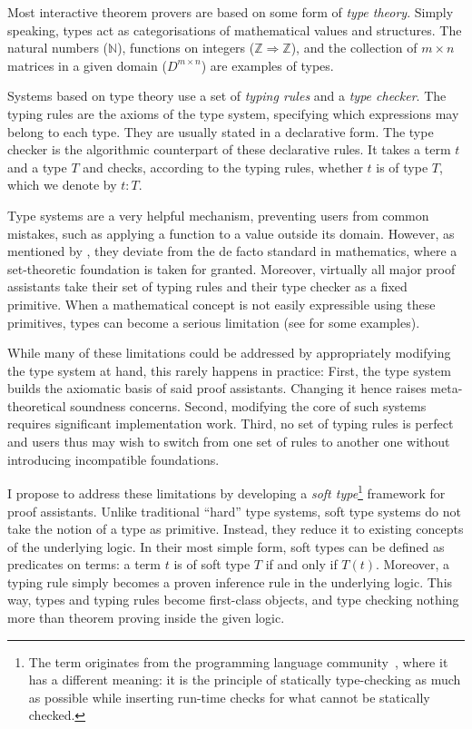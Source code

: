 \documentclass[a4paper, 12pt]{article}
\theoremstyle{plain}
\theoremstyle{definition}
\begin{document}
Most interactive theorem provers
are based on some form of \emph{type theory}.
Simply speaking,
types act as categorisations of mathematical values and structures.
The natural numbers ($\mathbb{N}$),
functions on integers ($\mathbb{Z}\Rightarrow \mathbb{Z}$),
and the collection of $m\times n$ matrices in a given domain ($D^{m\times n}$) are examples of types.

Systems based on type theory
use a set of \emph{typing rules} and a \emph{type checker}.
The typing rules are the axioms of the type system,
specifying which expressions may belong to each type.
They are usually stated in a declarative form.
The type checker is the algorithmic counterpart of these declarative rules.
It takes a term $t$ and a type $T$ and
checks, according to the typing rules,
whether $t$ is of type $T$, which we denote by $t : T$.

Type systems are a very helpful mechanism,
preventing users from common mistakes,
such as applying a function to a value outside its domain.
However, as mentioned by \citet{krauss},
they deviate from the de facto standard
in mathematics,
where a set-theoretic foundation is taken for granted.
Moreover, virtually all major proof assistants
take their set of typing rules and their type checker
as a fixed primitive.
When a mathematical concept is not easily expressible using these primitives,
types can become a serious limitation
(see \citet{krauss} for some examples).

While many of these limitations could be addressed
by appropriately modifying the type system at hand,
this rarely happens in practice:
First, the type system builds the axiomatic basis of said proof assistants.
Changing it hence raises meta-theoretical soundness concerns.
Second, modifying the core of such systems
requires significant implementation work.
Third, no set of typing rules is perfect
and users thus may wish to switch from one set of rules to another one
without introducing incompatible foundations.

I propose to address these limitations
by developing a \emph{soft type}\footnote{The term originates from the programming language community~\cite{cartwright},
where it has a different meaning: it is the principle of statically type-checking as much as possible while inserting run-time checks for what cannot be statically checked.}
framework for proof assistants.
Unlike traditional ``hard'' type systems,
soft type systems do not take the notion of a type as primitive.
Instead, they reduce it to existing concepts of the underlying logic.
In their most simple form,
soft types can be defined as predicates on terms:
a term $t$ is of soft type $T$ if and only if $T(t)$.
Moreover, a typing rule simply becomes a proven inference rule in the underlying logic.
This way, types and typing rules become first-class objects,
and type checking nothing more than
theorem proving inside the given logic.
\end{document}
